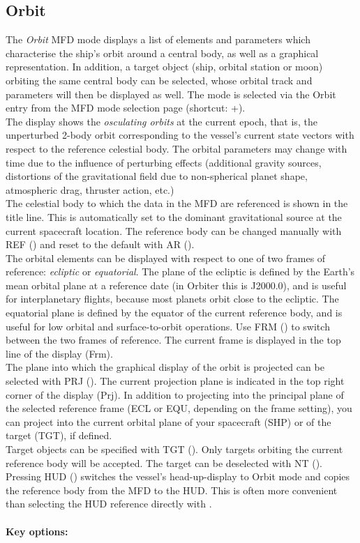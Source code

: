 \documentclass[Orbiter User Manual.tex]{subfiles}
\begin{document}
\subsection{Orbit}
\label{ssec:mfd_orbit}
The \textit{Orbit} MFD mode displays a list of elements and parameters which characterise the ship's orbit around a central body, as well as a graphical representation. In addition, a target object (ship, orbital station or moon) orbiting the same central body can be selected, whose orbital track and parameters will then be displayed as well. The mode is selected via the Orbit entry from the MFD mode selection page (shortcut: \Shift{}+\Shift{}).\\
The display shows the \textit{osculating orbits} at the current epoch, that is, the unperturbed 2-body orbit corresponding to the vessel's current state vectors with respect to the reference celestial body. The orbital parameters may change with time due to the influence of perturbing effects (additional gravity sources, distortions of the gravitational field due to non-spherical planet shape, atmospheric drag, thruster action, etc.)\\
The celestial body to which the data in the MFD are referenced is shown in the title line. This is automatically set to the dominant gravitational source at the current spacecraft location. The reference body can be changed manually with REF (\Shift{}) and reset to the default with AR (\Shift{}).\\
The orbital elements can be displayed with respect to one of two frames of reference: \textit{ecliptic} or \textit{equatorial}. The plane of the ecliptic is defined by the Earth's mean orbital plane at a reference date (in Orbiter this is J2000.0), and is useful for interplanetary flights, because most planets orbit close to the ecliptic. The equatorial plane is defined by the equator of the current reference body, and is useful for low orbital and surface-to-orbit operations. Use FRM (\Shift{}) to switch between the two frames of reference. The current frame is displayed in the top line of the display (Frm).\\
The plane into which the graphical display of the orbit is projected can be selected with PRJ (\Shift{}). The current projection plane is indicated in the top right corner of the display (Prj). In addition to projecting into the principal plane of the selected reference frame (ECL or EQU, depending on the frame setting), you can project into the current orbital plane of your spacecraft (SHP) or of the target (TGT), if defined.\\
Target objects can be specified with TGT (\Shift{}). Only targets orbiting the current reference body will be accepted. The target can be deselected with NT (\Shift{}).\\
Pressing HUD (\Shift{}) switches the vessel's head-up-display to Orbit mode and copies the reference body from the MFD to the HUD. This is often more convenient than selecting the HUD reference directly with \Ctrl{}.\\
\\
\textbf{Key options:}
\end{document}
